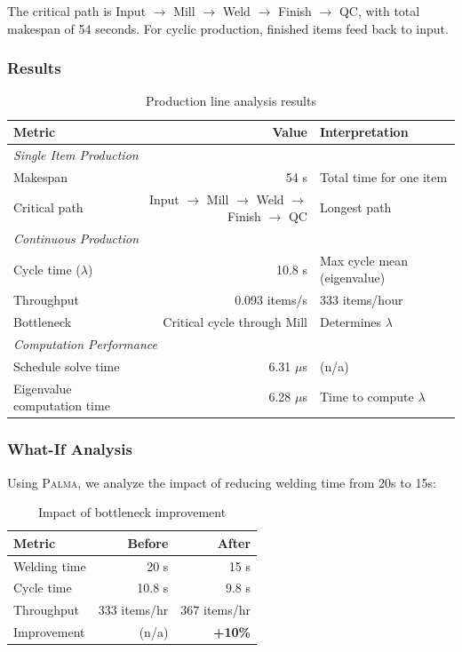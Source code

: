 \documentclass[11pt,a4paper]{article}
\theoremstyle{plain}
\theoremstyle{definition}
\newcommand{\palma}{\textsc{Palma}}
\begin{document}
The critical path is Input $\to$ Mill $\to$ Weld $\to$ Finish $\to$ QC, with total makespan of 54 seconds. For cyclic production, finished items feed back to input.

\subsubsection{Results}

\begin{table}[htbp]
\centering
\caption{Production line analysis results}
\label{tab:production-results}
\begin{tabular}{lrl}
\toprule
\textbf{Metric} & \textbf{Value} & \textbf{Interpretation} \\
\midrule
\multicolumn{3}{l}{\textit{Single Item Production}} \\
\quad Makespan & 54 s & Total time for one item \\
\quad Critical path & Input $\to$ Mill $\to$ Weld $\to$ Finish $\to$ QC & Longest path \\
\midrule
\multicolumn{3}{l}{\textit{Continuous Production}} \\
\quad Cycle time ($\lambda$) & 10.8 s & Max cycle mean (eigenvalue) \\
\quad Throughput & 0.093 items/s & 333 items/hour \\
\quad Bottleneck & Critical cycle through Mill & Determines $\lambda$ \\
\midrule
\multicolumn{3}{l}{\textit{Computation Performance}} \\
\quad Schedule solve time & 6.31 $\mu$s & (n/a) \\
\quad Eigenvalue computation time & 6.28 $\mu$s & Time to compute $\lambda$ \\
\bottomrule
\end{tabular}
\end{table}

\subsubsection{What-If Analysis}

Using \palma{}, we analyze the impact of reducing welding time from 20s to 15s:

\begin{table}[htbp]
\centering
\caption{Impact of bottleneck improvement}
\label{tab:what-if}
\begin{tabular}{lrr}
\toprule
\textbf{Metric} & \textbf{Before} & \textbf{After} \\
\midrule
Welding time & 20 s & 15 s \\
Cycle time & 10.8 s & 9.8 s \\
Throughput & 333 items/hr & 367 items/hr \\
Improvement & (n/a) & \textbf{+10\%} \\
\bottomrule
\end{tabular}
\end{table}
\end{document}

